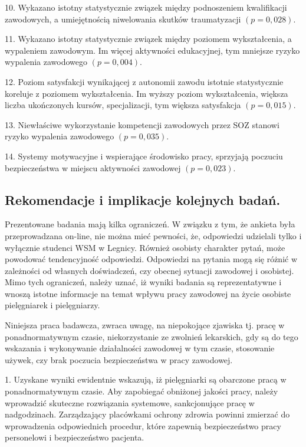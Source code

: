 \documentclass[a4paper,12pt,twoside,openright]{mwrep}
\begin{document}
10. Wykazano istotny statystycznie związek między podnoszeniem kwalifikacji zawodowych, a umiejętnością niwelowania skutków traumatyzacji $(p=0,028)$.

11. Wykazano istotny statystycznie związek między poziomem wykształcenia, a wypaleniem zawodowym. Im więcej aktywności edukacyjnej, tym mniejsze ryzyko wypalenia zawodowego $(p=0,004)$.


12. Poziom satysfakcji wynikającej z autonomii zawodu istotnie statystycznie koreluje z poziomem wykształcenia. Im wyższy poziom wykształcenia, większa liczba ukończonych kursów, specjalizacji, tym większa satysfakcja $(p = 0,015)$.

13. Niewłaściwe wykorzystanie kompetencji zawodowych przez SOZ stanowi ryzyko wypalenia zawodowego $ (p = 0,035)$.

14.  Systemy motywacyjne i  wspierające środowisko pracy, sprzyjają poczuciu bezpieczeństwa w miejscu aktywności zawodowej $(p = 0,023)$.








\vspace{\baselineskip} 

\subsection*{Rekomendacje i implikacje kolejnych badań.}


Prezentowane badania mają kilka ograniczeń. W związku z tym, że ankieta była przeprowadzana on-line, nie można mieć pewności, że, odpowiedzi udzielali tylko i wyłącznie studenci WSM w Legnicy. Również osobisty charakter pytań, może powodować tendencyjność odpowiedzi. Odpowiedzi na pytania mogą się różnić w zależności od własnych doświadczeń,  czy obecnej sytuacji zawodowej i osobistej. Mimo tych ograniczeń, należy uznać, iż wyniki badania są reprezentatywne i wnoszą istotne informacje na temat wpływu pracy zawodowej na życie osobiste pielęgniarek i pielęgniarzy.


Niniejsza praca badawcza, zwraca uwagę, na niepokojące zjawiska tj. pracę w ponadnormatywnym czasie, niekorzystanie ze zwolnień lekarskich, gdy są do tego wskazania i wykonywanie działalności zawodowej w tym czasie, stosowanie używek, czy brak poczucia bezpieczeństwa w pracy zawodowej.

1.	 Uzyskane wyniki ewidentnie wskazują, iż pielęgniarki są obarczone pracą w ponadnormatywnym czasie. Aby zapobiegać obniżonej jakości pracy, należy wprowadzić skuteczne rozwiązania systemowe, sankcjonujące pracę w nadgodzinach. Zarządzający placówkami ochrony zdrowia powinni zmierzać do wprowadzenia odpowiednich procedur, które zapewnią bezpieczeństwo pracy personelowi i bezpieczeństwo pacjenta.
\end{document}
